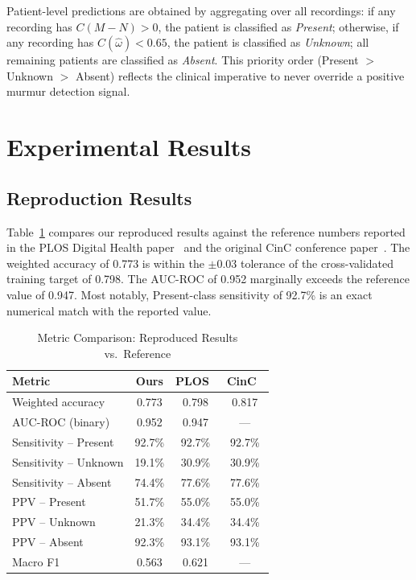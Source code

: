 \documentclass[conference]{IEEEtran}
\begin{document}
Patient-level predictions are obtained by aggregating over all
recordings: if any recording has $C(M\!-\!N) > 0$, the patient is
classified as \textit{Present}; otherwise, if any recording has
$C(\hat{\omega}) < 0.65$, the patient is classified as
\textit{Unknown}; all remaining patients are classified as
\textit{Absent}. This priority order (Present $>$ Unknown $>$ Absent)
reflects the clinical imperative to never override a positive murmur
detection signal.

\section{Experimental Results}

\subsection{Reproduction Results}

Table~\ref{tab:metrics} compares our reproduced results against the
reference numbers reported in the PLOS Digital Health
paper~\cite{mcdonald2024} and the original CinC conference
paper~\cite{mcdonald2022}. The weighted accuracy of 0.773 is within
the $\pm 0.03$ tolerance of the cross-validated training target of
0.798. The AUC-ROC of 0.952 marginally exceeds the reference value of
0.947. Most notably, Present-class sensitivity of 92.7\% is an exact
numerical match with the reported value.

\begin{table}[t]
  \caption{Metric Comparison: Reproduced Results vs.\ Reference}
  \label{tab:metrics}
  \centering
  \small
  \begin{tabular}{l c c c}
    \toprule
    \textbf{Metric} & \textbf{Ours} & \textbf{PLOS~\cite{mcdonald2024}} & \textbf{CinC~\cite{mcdonald2022}} \\
    \midrule
    Weighted accuracy       & 0.773  & 0.798  & 0.817 \\
    AUC-ROC (binary)        & 0.952  & 0.947  & ---   \\
    Sensitivity -- Present  & 92.7\% & 92.7\% & 92.7\% \\
    Sensitivity -- Unknown  & 19.1\% & 30.9\% & 30.9\% \\
    Sensitivity -- Absent   & 74.4\% & 77.6\% & 77.6\% \\
    PPV -- Present          & 51.7\% & 55.0\% & 55.0\% \\
    PPV -- Unknown          & 21.3\% & 34.4\% & 34.4\% \\
    PPV -- Absent           & 92.3\% & 93.1\% & 93.1\% \\
    Macro F1                & 0.563  & 0.621  & ---   \\
    \bottomrule
  \end{tabular}
\end{table}
\end{document}
